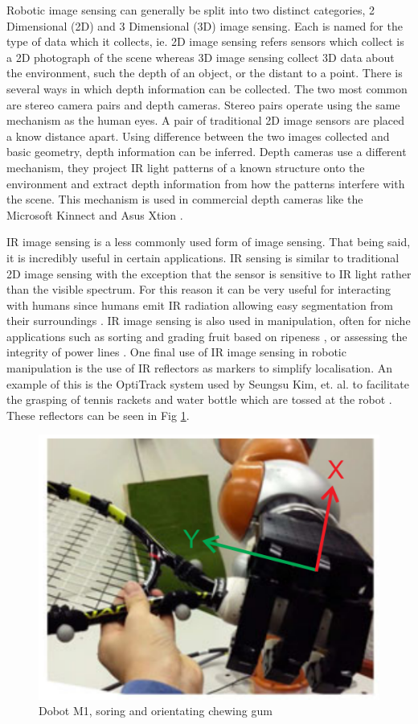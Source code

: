 Robotic image sensing can generally be split into two distinct categories, 2 Dimensional (2D) and 3 Dimensional (3D) image sensing. Each is named for the type of data which it collects, ie. 2D image sensing refers sensors which collect is a 2D photograph of the scene whereas 3D image sensing collect 3D data about the environment, such the depth of an object, or the distant to a point. There is several ways in which depth information can be collected. The two most common are stereo camera pairs and depth cameras. Stereo pairs operate using the same mechanism as the human eyes. A pair of traditional 2D image sensors are placed a know distance apart. Using difference between the two images collected and basic geometry, depth information can be inferred. Depth cameras use a different mechanism, they project IR light patterns of a known structure onto the environment and extract depth information from how the patterns interfere with the scene. This mechanism is used in commercial depth cameras like the Microsoft Kinnect and Asus Xtion \cite{APCinhandproxandcontact}.

IR image sensing is a less commonly used form of image sensing. That being said, it is incredibly useful in certain applications. IR sensing is similar to traditional 2D image sensing with the exception that the sensor is sensitive to IR light rather than the visible spectrum. For this reason it can be very useful for interacting with humans since humans emit IR radiation allowing easy segmentation from their surroundings \cite{HumanIR}. IR image sensing is also used in manipulation, often for niche applications such as sorting and grading fruit based on ripeness \cite{MangoTest}, or assessing the integrity of power lines \cite{IRPowerLines}. One final use of IR image sensing in robotic manipulation is the use of IR reflectors as markers to simplify localisation. An example of this is the OptiTrack system \cite{OptiTrack} used by Seungsu Kim, et. al. to facilitate the grasping of tennis rackets and water bottle which are tossed at the robot \cite{TennisRacket}. These reflectors can be seen in Fig \ref{fig:IRMarkers}.

\begin{figure}
    \centering
    \includegraphics[width=.4\textwidth]{Images/CatchingObjectInFlight.png}
    \caption{Dobot M1, soring and orientating chewing gum}
    \label{fig:IRMarkers}
\end{figure}

